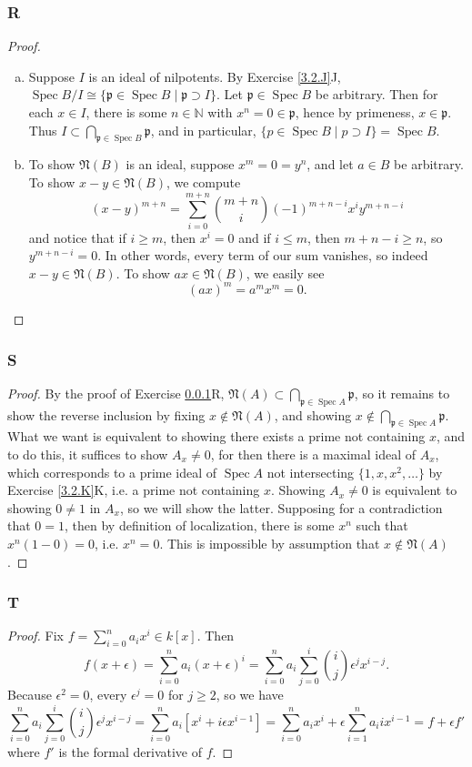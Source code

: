 \documentclass{article}
\newcommand{\N}{\mathbb{N}}
\newcommand{\frkp}{\mathfrak{p}}
\newcommand{\frkN}{\mathfrak{N}}
\DeclareMathOperator{\Spec}{\mathrm{Spec}}
\theoremstyle{definition} %
\begin{document}
\subsubsection{R}\label{3.2.R}
\begin{proof}
    \begin{enumerate}[(a)]
        \item Suppose $I$ is an ideal of nilpotents. By Exercise \ref{3.2.J}J, $\Spec B/I \cong \{\frkp \in \Spec B\mid \frkp \supset I \}$. Let $\frkp \in \Spec B$ be arbitrary. Then for each $x\in I$, there is some $n\in \N$ with $x^n=0 \in \frkp$, hence by primeness, $x\in \frkp$. Thus $I\subset \bigcap_{\frkp \in \Spec B} \frkp$, and in particular, $\{p\in \Spec B \mid p\supset I\} = \Spec B$.
        \item To show $\frkN(B)$ is an ideal, suppose $x^m=0=y^n$, and let $a\in B$ be arbitrary. To show $x-y\in \frkN(B)$, we compute
        \[
        (x-y)^{m+n}=\sum_{i=0}^{m+n} \binom{m+n}{i}(-1)^{m+n-i} x^i y^{m+n-i}
        \]
        and notice that if $i\geq m$, then $x^i=0$ and if $i\le m$, then $m+n-i\ge n$, so $y^{m+n-i}=0$. In other words, every term of our sum vanishes, so indeed $x-y\in \frkN(B)$. To show $ax\in \frkN(B)$, we easily see
        \[
        (ax)^m=a^m x^m =0.
        \]
    \end{enumerate}
\end{proof}
\subsubsection{S}\label{3.2.S}
\begin{proof}
    By the proof of Exercise \ref{3.2.R}R, $\frkN(A)\subset \bigcap_{\frkp\in \Spec A} \frkp$, so it remains to show the reverse inclusion by fixing $x\notin \frkN(A)$, and showing $x\notin \bigcap_{\frkp\in \Spec A} \frkp$. What we want is equivalent to showing there exists a prime not containing $x$, and to do this, it suffices to show $A_x \ne 0$, for then there is a maximal ideal of $A_x$, which corresponds to a prime ideal of $\Spec A$ not intersecting $\{1,x,x^2,\dots \}$ by Exercise \ref{3.2.K}K, i.e. a prime not containing $x$. Showing $A_x\ne 0$ is equivalent to showing $0\ne 1$ in $A_x$, so we will show the latter. Supposing for a contradiction that $0=1$, then by definition of localization, there is some $x^n$ such that $x^n(1-0)=0$, i.e. $x^n=0$. This is impossible by assumption that $x\notin \frkN(A)$.
\end{proof}
\subsubsection{T}\label{3.2.T}
\begin{proof}
    Fix $f=\sum_{i=0}^n a_i x^i \in k[x]$. Then
    \[
    f(x+\epsilon)=\sum_{i=0}^n a_i (x+\epsilon)^i = \sum_{i=0}^n a_i \sum_{j=0}^i \binom{i}{j}  \epsilon^j x^{i-j}.
    \]
    Because $\epsilon^2=0$, every $\epsilon^j=0$ for $j\ge 2$, so we have
    \[
    \sum_{i=0}^n a_i \sum_{j=0}^i \binom{i}{j}  \epsilon^j x^{i-j}=\sum_{i=0}^n a_i \left[ x^i + i\epsilon x^{i-1} \right]=\sum_{i=0}^n a_i x^i +\epsilon \sum_{i=1}^n a_i i x^{i-1}=f+\epsilon f'
    \]
    where $f'$ is the formal derivative of $f$.
\end{proof}
\end{document}
